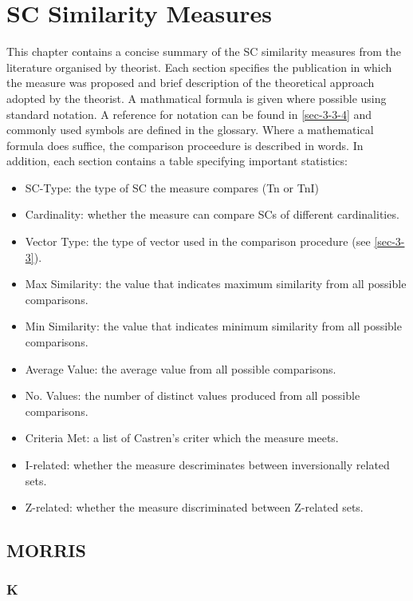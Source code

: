 \documentclass{article}
\begin{document}
\clearpage



\clearpage
\appendix
\section{SC Similarity Measures}
\label{sec-13}

This chapter contains a concise summary of the SC similarity measures
from the literature organised by theorist. Each section specifies the
publication in which the measure was proposed and brief description of
the theoretical approach adopted by the theorist. A mathmatical
formula is given where possible using standard notation. A reference
for notation can be found in \ref{sec-3-3-4} and commonly used symbols are
defined in the glossary. Where a mathematical formula does suffice,
the comparison proceedure is described in words. In addition, each
section contains a table specifying important statistics:
\begin{itemize}
\item SC-Type: the type of SC the measure compares (Tn or TnI)
\item Cardinality: whether the measure can compare SCs of different
  cardinalities.
\item Vector Type: the type of vector used in the comparison procedure
  (see \ref{sec-3-3}).
\item Max Similarity: the value that indicates maximum similarity from all
  possible comparisons.
\item Min Similarity: the value that indicates minimum similarity from all
  possible comparisons.
\item Average Value: the average value from all possible comparisons.
\item No. Values: the number of distinct values produced from all possible
  comparisons.
\item Criteria Met: a list of Castren's criter which the measure meets.
\item I-related: whether the measure descriminates between inversionally
  related sets.
\item Z-related: whether the measure discriminated between Z-related sets.
\end{itemize}
\subsection{MORRIS}
\label{sec-13-1}
\subsubsection{K}
\label{sec-13-1-1}
\end{document}
